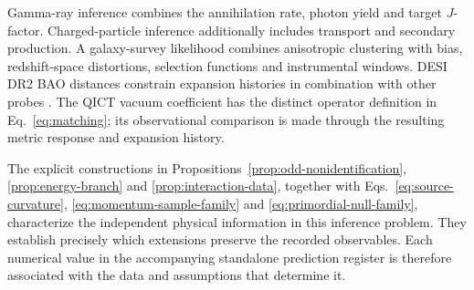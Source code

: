 Gamma-ray inference combines the annihilation rate, photon yield and target $J$-factor. Charged-particle inference additionally includes transport and secondary production. A galaxy-survey likelihood combines anisotropic clustering with bias, redshift-space distortions, selection functions and instrumental windows. DESI DR2 BAO distances constrain expansion histories in combination with other probes \cite{DESI25}. The QICT vacuum coefficient has the distinct operator definition in Eq.~\eqref{eq:matching}; its observational comparison is made through the resulting metric response and expansion history.

The explicit constructions in Propositions~\ref{prop:odd-nonidentification}, \ref{prop:energy-branch} and \ref{prop:interaction-data}, together with Eqs.~\eqref{eq:source-curvature}, \eqref{eq:momentum-sample-family} and \eqref{eq:primordial-null-family}, characterize the independent physical information in this inference problem. They establish precisely which extensions preserve the recorded observables. Each numerical value in the accompanying standalone prediction register is therefore associated with the data and assumptions that determine it.

